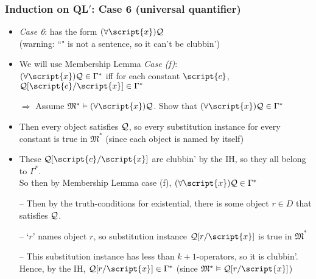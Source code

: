 \begin{frame}
\frametitle{Induction on QL$'$: Case 6 (universal quantifier)}

\begin{itemize}[<+->]

\item \emph{Case 6}:  has the form $\qt{\forall}{\script{x}} \metav{Q}$ \\ (warning: ``" is not a sentence, so it can't be clubbin')

\item We will use Membership Lemma \emph{Case (f)}: \\ \emph{$\qt{\forall}{\script{x}} \metav{Q} \in \Gamma^{\ast}$} iff for each constant $\script{c}$, $\metav{Q}\substitute{\script{x}}{\script{c}} \in \Gamma^{\ast}$




\medskip

\item[$\Rightarrow$] Assume $\mathfrak{M}^{\ast} \entails \qt{\forall}{\script{x}} \metav{Q}$. Show that $\qt{\forall}{\script{x}} \metav{Q} \in \Gamma^{\ast}$

\bi

\item Then every object satisfies $ \mathcal{Q}$, so every substitution instance for every constant is true in $\mathfrak{M}^{\ast}$ (since each object is named by itself)

\item These $\metav{Q}\substitute{\script{x}}{\script{c}}$ are clubbin' by the IH, so they all belong to $\Gamma^{\ast}$. \\ So then by Membership Lemma case (f), $\qt{\forall}{\script{x}} \metav{Q} \in \Gamma^{\ast}$

\ei

\iffalse
\item[] -- Then by the truth-conditions for existential, there is some object $r \in D$ that satisfies $\mathcal{Q}$. 
\item[] -- `$r$' names object $r$, so substitution instance $\metav{Q}\substitute{\script{x}}{r}$ is true in $\mathfrak{M}^{\ast}$
\item[] -- This substitution instance has less than $k+1$-operators, so it is clubbin'. Hence, by the IH, $\metav{Q}\substitute{\script{x}}{r} \in \Gamma^{\ast}$ (since $\mathfrak{M}^{\ast} \entails \metav{Q}\substitute{\script{x}}{r}$)


\end{itemize}
\end{frame}
